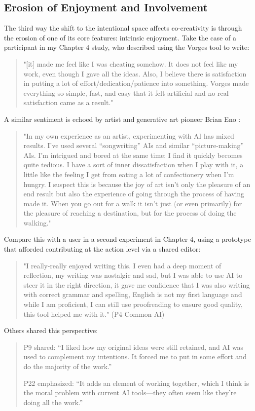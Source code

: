 \subsection{Erosion of Enjoyment and Involvement}
The third way the shift to the intentional space affects co-creativity is through the erosion of one of its core features: intrinsic enjoyment. Take the case of a participant in my Chapter 4 study, who described using the Vorges tool to write:
\begin{quote}
"[it] made me feel like I was cheating somehow. It does not feel like my work, even though I gave all the ideas. Also, I believe there is satisfaction in putting a lot of effort/dedication/patience into something. Vorges made everything so simple, fast, and easy that it felt artificial and no real satisfaction came as a result."
\end{quote}
A similar sentiment is echoed by artist and generative art pioneer Brian Eno \cite{Eno2024-rj}:
\begin{quote}
"In my own experience as an artist, experimenting with AI has mixed results. I’ve used several “songwriting” AIs and similar “picture-making” AIs. I’m intrigued and bored at the same time: I find it quickly becomes quite tedious. I have a sort of inner dissatisfaction when I play with it, a little like the feeling I get from eating a lot of confectionery when I’m hungry. I suspect this is because the joy of art isn’t only the pleasure of an end result but also the experience of going through the process of having made it. When you go out for a walk it isn’t just (or even primarily) for the pleasure of reaching a destination, but for the process of doing the walking."
\end{quote}
Compare this with a user in a second experiment in Chapter 4, using a prototype that afforded contributing at the action level via a shared editor:
\begin{quote}
"I really-really enjoyed writing this. I even had a deep moment of reflection, my writing was nostalgic and sad, but I was able to use AI to steer it in the right direction, it gave me confidence that I was also writing with correct grammar and spelling, English is not my first language and while I am proficient, I can still use proofreading to ensure good quality, this tool helped me with it." (P4 Common AI)
\end{quote}
Others shared this perspective:
\begin{quote}
P9 shared: “I liked how my original ideas were still retained, and AI was used to complement my intentions. It forced me to put in some effort and do the majority of the work.”

P22 emphasized: “It adds an element of working together, which I think is the moral problem with current AI tools—they often seem like they’re doing all the work.”
\end{quote}

